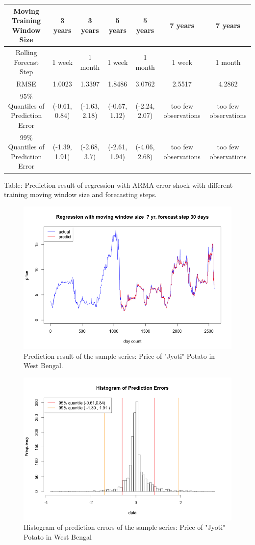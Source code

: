 \begin{table}[h]
\begin{tabular}{|c|c|c|c|c|c|c|}
\hline
\hspace{5pt} Moving Training Window Size & 3 years & 3 years & 5 years & 5 years & 7 years &  7 years \\ \hline
Rolling Forecast Step & 1 week & 1 month & 1 week & 1 month & 1 week & 1 month\\ \hline
RMSE & 1.0023 & 1.3397 & 1.8486 & 3.0762 & 2.5517 & 4.2862\\ \hline
95\% Quantiles of Prediction Error & (-0.61, 0.84) & (-1.63, 2.18) & (-0.67, 1.12) & (-2.24, 2.07) & too few observations & too few observations\\ \hline
99\% Quantiles of Prediction Error & (-1.39, 1.91) & (-2.68, 3.7) & (-2.61, 1.94) & (-4.06, 2.68) & too few observations & too few observations\\ \hline
\end{tabular}
\label{table:time series prediction results}
\end{table}
Table: Prediction result of regression with ARMA error shock with different training moving window size and forecasting steps.

\begin{figure}
    \centering
    \includegraphics[width=.7\textwidth]{./img/regression_prediction.png}
    \caption{Prediction result of the sample series: Price of "Jyoti" Potato in West Bengal. }
\end{figure}

\begin{figure}
    \centering
    \includegraphics[width=.7\textwidth]{./img/histogram_of_errors.png}
    \caption{Histogram of prediction errors of the sample series: Price of "Jyoti" Potato in West Bengal}
\end{figure}



